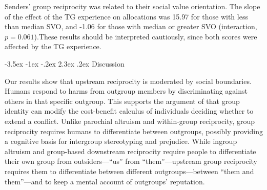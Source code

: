 \documentclass[12pt,a4paper]{article}\usepackage[]{graphicx}\usepackage[]{color}
\makeatletter
\renewcommand\section{\@startsection {section}{1}{\z@}%
{-3.5ex \@plus -1ex \@minus -.2ex}%
{2.3ex \@plus.2ex}%
{\bf\sffamily\Large}}
\makeatother
\begin{document}

Senders' group reciprocity was related to their social value orientation. The slope of the effect of the TG experience on allocations was 
15.97 for those with less than median SVO, and 
-1.06 for those with median or greater SVO 
(interaction, $p= 0.061$).These results should be interpreted cautiously, since both scores were 
affected by the TG experience. 



\section{Discussion}
\label{sec:conclusion}

Our results show that upstream reciprocity is moderated by social boundaries. 
Humans respond to harms from outgroup members by discriminating against others 
in that specific outgroup. This supports the argument of \citet{Pietraszewski2016470} that group identity can modify the cost-benefit calculus of individuals deciding whether to extend a conflict. Unlike parochial altruism and within-group reciprocity, group reciprocity requires humans to differentiate between outgroups, possibly providing a cognitive basis for intergroup stereotyping and prejudice.
While ingroup altruism and group-based downstream reciprocity require people to differentiate their own group from outsiders---``us'' from ``them''---upstream group  reciprocity requires them to differentiate between different outgroups---between ``them and them''---and to keep a mental account of outgroups' reputation. 
\end{document}
